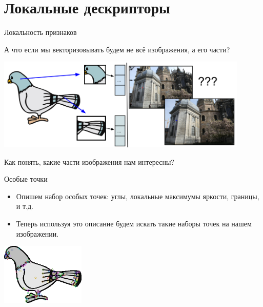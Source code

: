 \section{Локальные дескрипторы}


\begin{frame}{Локальность признаков}

А что если мы векторизовывать будем не всё изображения, а его части?

\includegraphics[width=0.9\textwidth]{images/pigeon local2.png}

Как понять, какие части изображения нам интересны?
    
\end{frame}

\begin{frame}{Особые точки}

\begin{itemize}
    \item Опишем набор особых точек: углы, локальные максимумы яркости, границы, и т.д.
    \item Теперь используя это описание будем искать такие наборы точек на нашем изображении.
\end{itemize}
\centering
\includegraphics[width=0.3\textwidth]{images/pigeon_sift.png}
\end{frame}

